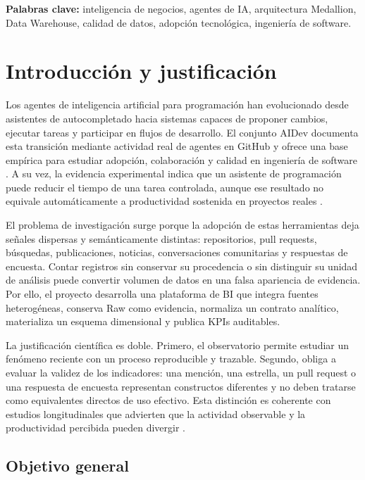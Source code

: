\documentclass[12pt,a4paper]{article}
\begin{document}
\textbf{Palabras clave:} inteligencia de negocios, agentes de IA, arquitectura Medallion, Data Warehouse, calidad de datos, adopción tecnológica, ingeniería de software.

\section{Introducción y justificación}

Los agentes de inteligencia artificial para programación han evolucionado desde asistentes de autocompletado hacia sistemas capaces de proponer cambios, ejecutar tareas y participar en flujos de desarrollo. El conjunto AIDev documenta esta transición mediante actividad real de agentes en GitHub y ofrece una base empírica para estudiar adopción, colaboración y calidad en ingeniería de software \cite{aidev_dataset,aidev_paper}. A su vez, la evidencia experimental indica que un asistente de programación puede reducir el tiempo de una tarea controlada, aunque ese resultado no equivale automáticamente a productividad sostenida en proyectos reales \cite{peng_copilot,stray_copilot}.

El problema de investigación surge porque la adopción de estas herramientas deja señales dispersas y semánticamente distintas: repositorios, pull requests, búsquedas, publicaciones, noticias, conversaciones comunitarias y respuestas de encuesta. Contar registros sin conservar su procedencia o sin distinguir su unidad de análisis puede convertir volumen de datos en una falsa apariencia de evidencia. Por ello, el proyecto desarrolla una plataforma de BI que integra fuentes heterogéneas, conserva Raw como evidencia, normaliza un contrato analítico, materializa un esquema dimensional y publica KPIs auditables.

La justificación científica es doble. Primero, el observatorio permite estudiar un fenómeno reciente con un proceso reproducible y trazable. Segundo, obliga a evaluar la validez de los indicadores: una mención, una estrella, un pull request o una respuesta de encuesta representan constructos diferentes y no deben tratarse como equivalentes directos de uso efectivo. Esta distinción es coherente con estudios longitudinales que advierten que la actividad observable y la productividad percibida pueden divergir \cite{stray_copilot}.

\subsection{Objetivo general}
\end{document}
